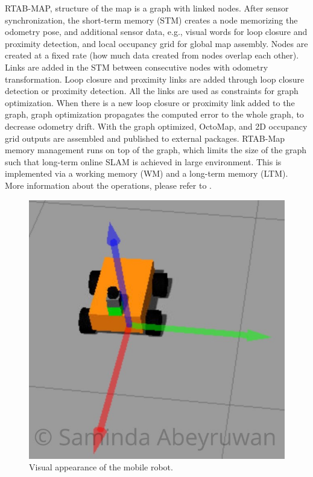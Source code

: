 \documentclass[10pt,journal,compsoc]{IEEEtran}
\begin{document}
RTAB-MAP, structure of the map is a graph with linked nodes. After sensor synchronization, the short-term memory (STM) creates a node memorizing the odometry pose, and additional sensor data, e.g., visual words for loop closure and proximity detection, and local occupancy grid for global map assembly. Nodes are created at a fixed rate (how much data created from nodes overlap each other). Links are added in the STM between consecutive nodes with odometry transformation. Loop closure and proximity links are added through loop closure detection or proximity detection. All the links are used as constraints for graph optimization. When there is a new loop closure or proximity link added to the graph, graph optimization propagates the computed error to the whole graph, to decrease odometry drift. With the graph optimized, OctoMap, and 2D occupancy grid outputs are assembled and published to external packages. RTAB-Map memory management runs on top of the graph, which limits the size of the graph such that long-term online SLAM is achieved in large environment. This is implemented via a working memory (WM) and a long-term memory (LTM). More information about the operations, please refer to \cite{labbertab}.

\begin{figure}[thpb]
      \centering
      \includegraphics[width=0.5\linewidth]{sb_w.jpeg}
      \caption{Visual appearance of the mobile robot.}
      \label{fig:sb}
\end{figure}
\end{document}
